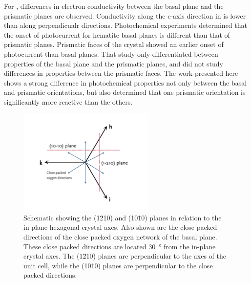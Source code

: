 For , differences in electron conductivity between the basal plane and the
prismatic planes are observed. Conductivity along the c-axis direction in  is
lower than along perpendicualr directions.\cite{Huda:2010kx,Iordanova:2005ha}
Photochemical experiments determined that the onset of photocurrent for hematite basal
planes is different than that of prismatic planes.\cite{Eggleston:2009ic} Prismatic faces
of the crystal showed an earlier onset of photocurrent than basal planes. That study only
differentiated between properties of the basal plane and the prismatic planes, and did not
study differences in properties between the prismatic faces. The work presented here shows
a strong difference in photochemical properties not only between the basal and prismatic
orientations, but also determined that one prismatic orientation is significantly more
reactive than the others. 

\begin{figure}
\begin{center}
\includegraphics[width=0.6\textwidth]{fe2o3axes.pdf}
\caption[(1\={2}10) and (10\={1}0) planes in relation to in-plane crystal axes]{%
	Schematic showing the (1\={2}10) and (10\={1}0) planes in 
	relation to the in-plane hexagonal crystal axes. Also shown 
	are the close-packed directions of the close packed oxygen 
	network of the basal plane. These close packed directions are 
	located \SI{30}{\degree} from the in-plane crystal axes. The 
	(1\={2}10) planes are perpendicular to the axes of the unit 
	cell, while the (10\={1}0) planes are perpendicular to the 
	close packed directions.
}
\label{fig:fe2o3axes}
\end{center}
\end{figure}
			

